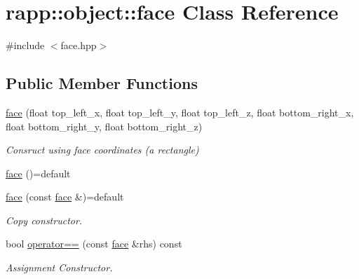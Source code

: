 \hypertarget{classrapp_1_1object_1_1face}{\section{rapp\-:\-:object\-:\-:face Class Reference}
\label{classrapp_1_1object_1_1face}
}


{\ttfamily \#include $<$face.\-hpp$>$}

\subsection*{Public Member Functions}
\begin{DoxyCompactItemize}
\item 
\hyperlink{classrapp_1_1object_1_1face_ab69a3ccafd0519c4c4a72af1142b4b07}{face} (float top\-\_\-left\-\_\-x, float top\-\_\-left\-\_\-y, float top\-\_\-left\-\_\-z, float bottom\-\_\-right\-\_\-x, float bottom\-\_\-right\-\_\-y, float bottom\-\_\-right\-\_\-z)
\begin{DoxyCompactList}\small\item\em Consruct using face coordinates (a rectangle) \end{DoxyCompactList}\item 
\hyperlink{classrapp_1_1object_1_1face_a94a6ba1f4f7e3e8b1398d5dbdd76acc9}{face} ()=default
\item 
\hyperlink{classrapp_1_1object_1_1face_a10fb28c9941145226e99111e73ed21ac}{face} (const \hyperlink{classrapp_1_1object_1_1face}{face} \&)=default
\begin{DoxyCompactList}\small\item\em Copy constructor. \end{DoxyCompactList}\item 
bool \hyperlink{classrapp_1_1object_1_1face_a8f1e247f980687e40969c159e7308ecd}{operator==} (const \hyperlink{classrapp_1_1object_1_1face}{face} \&rhs) const 
\begin{DoxyCompactList}\small\item\em Assignment Constructor. \end{DoxyCompactList}\end{DoxyCompactItemize}
